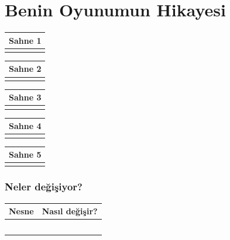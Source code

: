 \documentclass[12pt, a4paper]{article}
\begin{document}
\section*{Benin Oyunumun Hikayesi}

\noindent
\begin{tabular}{| p{16.5cm}  |  }
\hline			
Sahne 1\\
\hline
 \\[50ex]
\hline  
\end{tabular}

\vspace{5ex}
\noindent
\begin{tabular}{| p{16.5cm}  |  }
\hline			
Sahne 2\\
\hline
 \\[50ex]
\hline  
\end{tabular}

\vspace{5ex}
\noindent
\begin{tabular}{| p{16.5cm}  |  }
\hline			
Sahne 3\\
\hline
 \\[50ex]
\hline  
\end{tabular}

\vspace{5ex}
\noindent
\begin{tabular}{| p{16.5cm}  |  }
\hline			
Sahne 4\\
\hline
 \\[50ex]
\hline  
\end{tabular}

\vspace{5ex}
\noindent
\begin{tabular}{| p{16.5cm}  |  }
\hline			
Sahne 5\\
\hline
 \\[50ex]
\hline  
\end{tabular}

\subsubsection*{Neler değişiyor?}
\begin{tabular}{| p{4cm} | p{11cm} |  }
\hline			
Nesne&Nasıl değişir?\\
\hline
& \\[6ex]
\hline  
& \\[6ex]
\hline  
& \\[6ex]
\hline  
& \\[6ex]
\hline  
& \\[6ex]
\hline  
\end{tabular}
\end{document}
